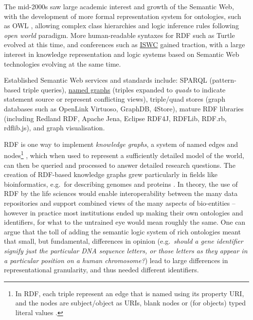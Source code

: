 \documentclass[fleqn,10pt,lineno]{wlpeerjlua}
\begin{document}
The mid-2000s saw large academic interest and growth of the Semantic Web, with the development of more formal representation system for ontologies, such as OWL \autocite{w3-owl2-overview}, allowing complex class hierarchies and logic inference rules following \emph{open world} paradigm.
More human-readable syntaxes for RDF such as Turtle evolved at this time, and conferences such as \href{https://iswc2022.semanticweb.org/}{ISWC} \autocite{horrocksSemanticWebISWC2002} gained traction, with a large interest in knowledge representation and logic systems based on Semantic Web technologies evolving at the same time.

Established Semantic Web services and standards include: SPARQL \autocite{w3-sparql11-overview} (pattern-based triple queries), \href{https://www.w3.org/TR/rdf11-concepts/\#section-dataset}{named graphs} \autocite{w3-rdf11-concepts} (triples expanded to \emph{quads} to indicate statement source or represent conflicting views), triple/quad stores (graph databases such as OpenLink Virtuoso, GraphDB, 4Store), mature RDF libraries (including Redland RDF, Apache Jena, Eclipse RDF4J, RDFLib, RDF.rb, rdflib.js), and  graph visualisation.

RDF is one way to implement \emph{knowledge graphs}, a system of named edges and nodes\footnote{In RDF, each triple represent an edge that is named using its property URI, and the nodes are subject/object as URIs, blank nodes or (for objects) typed literal values \autocite{w3-rdf11-primer}.} \autocite{nurdiati2008}, which when used to represent a sufficiently detailed model of the world, can then be queried and processed to answer detailed research questions. The creation of RDF-based knowledge graphs grew particularly in fields like bioinformatics, e.g.~for describing genomes and proteins \autocite{gobleStateNationData2008c,williamsOpenPHACTSSemantic2012c}. In theory, the use of RDF by the life sciences would enable interoperability between the many data repositories and support combined views of the many aspects of bio-entities -- however in practice most institutions ended up making their own ontologies and identifiers, for what to the untrained eye would mean roughly the same. One can argue that the toll of adding the semantic logic system of rich ontologies meant that small, but fundamental, differences in opinion (e.g.~\emph{should a gene identifier signify just the particular DNA sequence letters, or those letters as they appear in a particular position on a human chromosome?}) lead to large differences in representational granularity, and thus needed different identifiers.
\end{document}
